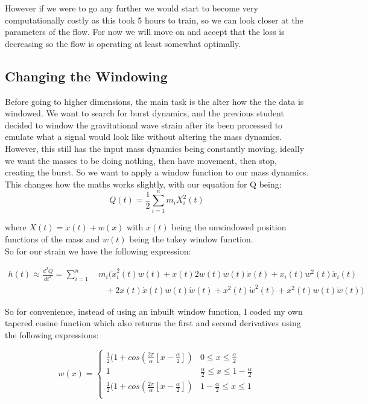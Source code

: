 \documentclass[a4paper, 12pt]{article}
\begin{document}
However if we were to go any further we would start to become very computationally costly as this took 5 hours to train, so we can look closer at the parameters of the flow. For now we will move on and accept that the loss is decreasing so the flow is operating at least somewhat optimally.

\subsection{Changing the Windowing}

Before going to higher dimensions, the main task is the alter how the the data is windowed. We want to search for burst dynamics, and the previous student decided to window the gravitational wave strain after its been processed to emulate what a signal would look like without altering the mass dynamics. However, this still has the input mass dynamics being constantly moving, ideally we want the masses to be doing nothing, then have movement, then stop, creating the burst. So we want to apply a window function to our mass dynamics. This changes how the maths works slightly, with our equation for Q being: $$Q(t) = \frac{1}{2} \sum_{i = 1}^{n} m_i X_{i}^{2}(t)$$

where $X(t) = x(t) + w(x)$ with $x(t)$ being the unwindowed position functions of the mass and $w(t)$ being the tukey window function. \\

So for our strain we have the following expression:


\begin{align*}\label{eq:h_windowed}
h(t) \approx \frac{d^2Q}{dt^2} =  \sum_{i=1}^{n} & \ m_i(\dot x_i^2(t) w(t)+ x(t) 2w(t) \dot w(t) \dot x(t) + x_i(t) w^2(t) \ddot x_i(t)\\
&\quad  + 2x(t) \dot x(t) w(t) \dot w(t) + x^2(t) \dot w^2(t) + x^2(t) w(t) \ddot w(t))
\end{align*}

So for convenience, instead of using an inbuilt window function, I coded my own tapered cosine function which also returns the first and second derivatives using the following expressions:

$$ w(x)=   \left\{
\begin{array}{ll}
      \frac{1}{2} (1 + cos\left(\frac{2 \pi}{\alpha} [x - \frac{\alpha}{2}]\right) & 0 \leq x \leq \frac{\alpha}{2} \\
      1 & \frac{\alpha}{2} \leq x \leq 1 - \frac{\alpha}{2} \\
      \frac{1}{2} (1 + cos\left(\frac{2 \pi}{\alpha} [x - \frac{\alpha}{2}]\right) & 1 - \frac{\alpha}{2} \leq x \leq 1 \\
\end{array}
\right.  $$
\end{document}
